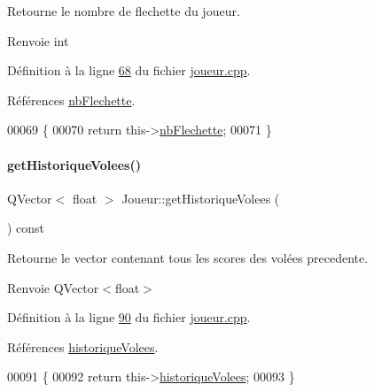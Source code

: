 Retourne le nombre de flechette du joueur. 

\begin{DoxyReturn}{Renvoie}
int 
\end{DoxyReturn}


Définition à la ligne \hyperlink{joueur_8cpp_source_l00068}{68} du fichier \hyperlink{joueur_8cpp_source}{joueur.\+cpp}.



Références \hyperlink{joueur_8h_source_l00046}{nb\+Flechette}.


\begin{DoxyCode}
00069 \{
00070     \textcolor{keywordflow}{return} this->\hyperlink{class_joueur_a330099a1952fbf97b2faea2c640b32f5}{nbFlechette};
00071 \}
\end{DoxyCode}
\mbox{\label{class_joueur_a2f99a607d1806aae8361bbff086947f1}} 
\paragraph{\texorpdfstring{get\+Historique\+Volees()}{getHistoriqueVolees()}}
{\footnotesize\ttfamily Q\+Vector$<$ float $>$ Joueur\+::get\+Historique\+Volees (\begin{DoxyParamCaption}{ }\end{DoxyParamCaption}) const}



Retourne le vector contenant tous les scores des volées precedente. 

\begin{DoxyReturn}{Renvoie}
Q\+Vector$<$float$>$ 
\end{DoxyReturn}


Définition à la ligne \hyperlink{joueur_8cpp_source_l00090}{90} du fichier \hyperlink{joueur_8cpp_source}{joueur.\+cpp}.



Références \hyperlink{joueur_8h_source_l00042}{historique\+Volees}.


\begin{DoxyCode}
00091 \{
00092     \textcolor{keywordflow}{return} this->\hyperlink{class_joueur_aeb24d1e8125a7bf302167b91a945687e}{historiqueVolees};
00093 \}
\end{DoxyCode}
\mbox{\label{class_joueur_ace9bf081d3f518eaed93b53153efcf19}} 
